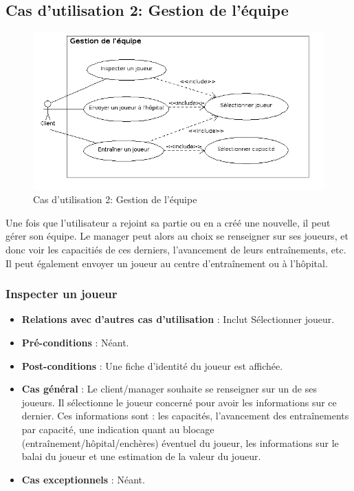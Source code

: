 \documentclass[a4paper,titlepage]{scrreprt}
\begin{document}
  \subsection{Cas d'utilisation 2: Gestion de l'équipe}
  \begin{figure}[H]
    \center
    \includegraphics[scale=0.5]{uml/useCaseView/GestionEquipe.png}
    \caption{Cas d'utilisation 2: Gestion de l'équipe}
  \end{figure}  
    Une fois que l'utilisateur a rejoint sa \gls{partie} ou en a créé une nouvelle, il peut gérer son équipe. Le manager peut alors au choix se renseigner sur ses joueurs, et donc voir les capacitiés de ces derniers, l'avancement de leurs entraînements, etc. Il peut également envoyer un joueur au centre d'entraînement ou à l'hôpital.

    \subsubsection{Inspecter un joueur}
      \begin{itemize}
        \item \textbf{Relations avec d'autres cas d'utilisation}  : Inclut Sélectionner joueur.
        \item \textbf{Pré-conditions} : Néant.
        \item \textbf{Post-conditions} : Une fiche d'identité du joueur est affichée.
        \item \textbf{Cas général} : Le client/manager souhaite se renseigner sur un de ses joueurs. Il sélectionne le joueur concerné pour avoir les informations sur ce dernier. Ces informations sont : les capacités, l'avancement des entraînements par capacité, une indication quant au blocage (entraînement/hôpital/enchères) éventuel du joueur, les informations sur le balai du joueur et une estimation de la valeur du joueur.
        \item \textbf{Cas exceptionnels} : Néant.
      \end{itemize}
\end{document}
